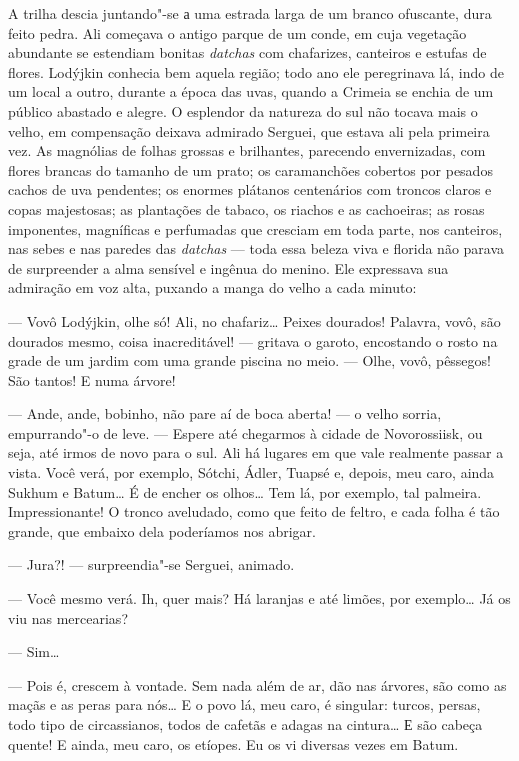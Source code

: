 A trilha descia juntando"-se а uma estrada larga de um branco ofuscante,
dura feito pedra. Ali começava o antigo parque de um conde, em cuja
vegetação abundante se estendiam bonitas \emph{datchas} com chafarizes,
canteiros e estufas de flores. Lodýjkin conhecia bem aquela região; todo
ano ele peregrinava lá, indo de um local a outro, durante a época das
uvas, quando a Crimeia se enchia de um público abastado e alegre. O
esplendor da natureza do sul não tocava mais o velho, em compensação
deixava admirado Serguei, que estava ali pela primeira vez. As magnólias
de folhas grossas e brilhantes, parecendo envernizadas, com flores
brancas do tamanho de um prato; os caramanchões cobertos por pesados
cachos de uva pendentes; os enormes plátanos centenários com troncos
claros e copas majestosas; as plantações de tabaco, os riachos e as
cachoeiras; as rosas imponentes, magníficas e perfumadas que cresciam em
toda parte, nos canteiros, nas sebes e nas paredes das \emph{datchas}
--- toda essa beleza viva e florida não parava de surpreender a alma
sensível e ingênua do menino. Ele expressava sua admiração em voz alta,
puxando a manga do velho a cada minuto:

--- Vovô Lodýjkin, olhe só! Ali, no chafariz\ldots{} Peixes dourados!
Palavra, vovô, são dourados mesmo, coisa inacreditável! --- gritava o
garoto, encostando o rosto na grade de um jardim com uma grande piscina
no meio. --- Olhe, vovô, pêssegos! São tantos! E numa árvore!

--- Ande, ande, bobinho, não pare aí de boca aberta! --- o velho sorria,
empurrando"-o de leve. --- Espere até chegarmos à cidade de Novorossiisk,
ou seja, até irmos de novo para o sul. Ali há lugares em que vale
realmente passar a vista. Você verá, por exemplo, Sótchi, Ádler, Tuapsé
e, depois, meu caro, ainda Sukhum e Batum\ldots{} É de encher os olhos\ldots{} Tem
lá, por exemplo, tal palmeira. Impressionante! O tronco aveludado, como
que feito de feltro, e cada folha é tão grande, que embaixo dela
poderíamos nos abrigar.

--- Jura?! --- surpreendia"-se Serguei, animado.

--- Você mesmo verá. Ih, quer mais? Há laranjas e até limões, por
exemplo\ldots{} Já os viu nas mercearias?

--- Sim\ldots{}

--- Pois é, crescem à vontade. Sem nada além de ar, dão nas árvores, são
como as maçãs e as peras para nós\ldots{} E o povo lá, meu caro, é singular:
turcos, persas, todo tipo de circassianos, todos de cafetãs e adagas na
cintura\ldots{} Е são cabeça quente! E ainda, meu caro, os etíopes. Eu os vi
diversas vezes em Batum.


